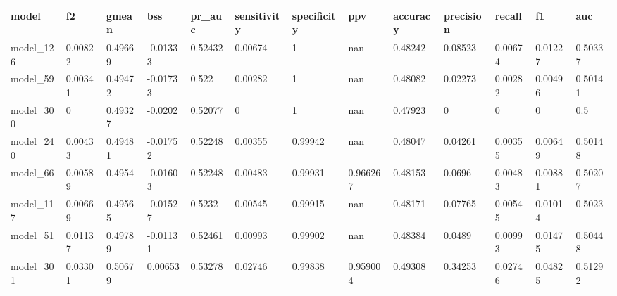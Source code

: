 \begin{tabular}{|l|l|l|l|l|l|l|l|l|l|l|l|l|}
\hline
\textbf{model} & \textbf{f2} & \textbf{gmean} & \textbf{bss} & \textbf{pr\_auc} & \textbf{sensitivity} & \textbf{specificity} & \textbf{ppv} & \textbf{accuracy} & \textbf{precision} & \textbf{recall} & \textbf{f1} & \textbf{auc} \\ \hline
model\_126     & 0.00822     & 0.49669        & -0.01333     & 0.52432          & 0.00674              & 1                    & nan          & 0.48242           & 0.08523            & 0.00674         & 0.01227     & 0.50337      \\ \hline
model\_59      & 0.00341     & 0.49472        & -0.01733     & 0.522            & 0.00282              & 1                    & nan          & 0.48082           & 0.02273            & 0.00282         & 0.00496     & 0.50141      \\ \hline
model\_300     & 0           & 0.49327        & -0.0202      & 0.52077          & 0                    & 1                    & nan          & 0.47923           & 0                  & 0               & 0           & 0.5          \\ \hline
model\_240     & 0.00433     & 0.49481        & -0.01752     & 0.52248          & 0.00355              & 0.99942              & nan          & 0.48047           & 0.04261            & 0.00355         & 0.00649     & 0.50148      \\ \hline
model\_66      & 0.00589     & 0.4954         & -0.01603     & 0.52248          & 0.00483              & 0.99931              & 0.966267     & 0.48153           & 0.0696             & 0.00483         & 0.00881     & 0.50207      \\ \hline
model\_117     & 0.00669     & 0.49565        & -0.01527     & 0.5232           & 0.00545              & 0.99915              & nan          & 0.48171           & 0.07765            & 0.00545         & 0.01014     & 0.5023       \\ \hline
model\_51      & 0.01137     & 0.49789        & -0.01131     & 0.52461          & 0.00993              & 0.99902              & nan          & 0.48384           & 0.0489             & 0.00993         & 0.01475     & 0.50448      \\ \hline
model\_301     & 0.03301     & 0.50679        & 0.00653      & 0.53278          & 0.02746              & 0.99838              & 0.959004     & 0.49308           & 0.34253            & 0.02746         & 0.04825     & 0.51292      \\ \hline

\end{tabular}
